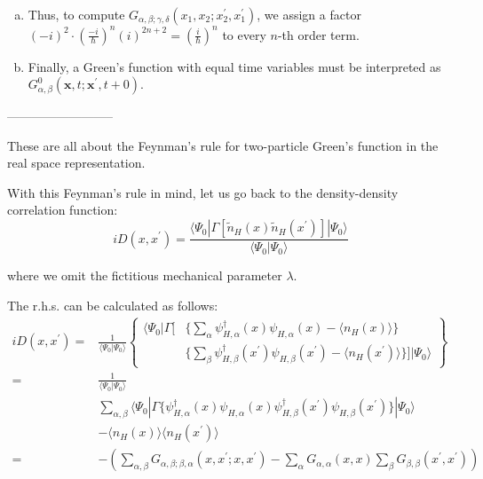 \begin{enumerate}[(a)]
* This additional $(-1)$ factor simply comes from the $(-1)$ factor which we get when exchanging these two creation operators.

The $n$-th order term has an explicit numerical factor $\left( \frac{-i}{\hbar} \right)^n$, while the $(2n+2)$ contractions of field operators contribute an additional factor $(i)^{2n+2}$.

On top of this, we have $(-i)^2$ factor, in the definition of the two-particle Green's function.
\item Thus, to compute $G_{\alpha,\beta;\gamma,\delta}(x_1,x_2;x_2^{'},x_1^{'})$, we assign a factor $(-i)^2\cdot\left( \frac{-i}{\hbar} \right)^n(i)^{2n+2} = \left( \frac{i}{\hbar} \right)^n$ to every $n$-th order term.

\item Finally, a Green's function with equal time variables must be interpreted as $G_{\alpha,\beta}^0 (\mathbf{x},t;\mathbf{x}^{'},t+0)$.
\end{enumerate}

\begin{center}--------------------------\end{center}

These are all about the Feynman's rule for two-particle Green's function in the real space representation.

With this Feynman's rule in mind, let us go back to the density-density correlation function:
\[i D(x,x^{'}) = \frac{\langle \Psi_0|\Gamma[\tilde{n}_H(x)\tilde{n}_H(x^{'})]|\Psi_0\rangle} {\langle \Psi_0|\Psi_0 \rangle}\]

where we omit the fictitious mechanical parameter $\lambda$.

The r.h.s. can be calculated as follows:
\[ \begin{split} i D(x,x^{'})
=&\frac{1}{\langle \Psi_0 | \Psi_0 \rangle}\left\{
\begin{split} \langle \Psi_0|\Gamma[&\{\sum_\alpha \psi_{H,\alpha}^\dagger(x)\psi_{H,\alpha}(x)-\langle n_H (x) \rangle\}\\
&\{\sum_\beta \psi_{H,\beta}^\dagger(x^{'}) \psi_{H,\beta}(x^{'})-\langle n_H (x^{'}) \rangle\}]|\Psi_0 \rangle
 \end{split} \right\}\\
=&\frac{1}{\langle \Psi_0 | \Psi_0 \rangle}\\
&\sum_{\alpha,\beta} \langle \Psi_0 | \Gamma\{\psi_{H,\alpha}^\dagger(x)\psi_{H,\alpha}(x)\psi_{H,\beta}^\dagger(x^{'})\psi_{H,\beta}(x^{'})\}|\Psi_0 \rangle\\
&-\langle n_H(x) \rangle \langle n_H(x^{'}) \rangle\\
=& - \left( \sum_{\alpha,\beta} G_{\alpha,\beta;\beta,\alpha}(x,x^{'};x,x^{'}) - \sum_{\alpha} G_{\alpha,\alpha}(x,x) \sum_{\beta}G_{\beta,\beta}(x^{'},x^{'}) \right)
 \end{split}\]

